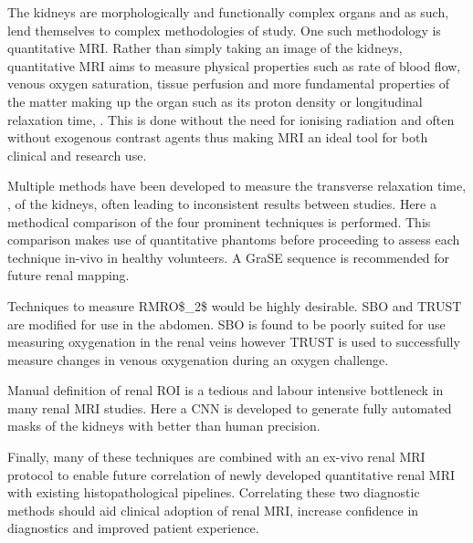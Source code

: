 The kidneys are morphologically and functionally complex organs and as such, lend themselves to complex methodologies of study. One such methodology is quantitative \ac{MRI}. Rather than simply taking an image of the kidneys, quantitative \ac{MRI} aims to measure physical properties such as rate of blood flow, venous oxygen saturation, tissue perfusion and more fundamental properties of the matter making up the organ such as its proton density or longitudinal relaxation time, \tone. This is done without the need for ionising radiation and often without exogenous contrast agents thus making \ac{MRI} an ideal tool for both clinical and research use.

Multiple methods have been developed to measure the transverse relaxation time, \ttwo, of the kidneys, often leading to inconsistent results between studies. Here a methodical comparison of the four prominent techniques is performed. This comparison makes use of quantitative phantoms before proceeding to assess each technique in-vivo in healthy volunteers. A \ac{GraSE} sequence is recommended for future renal \ttwo mapping.

Techniques to measure \ac{RMRO$_2$} would be highly desirable. \ac{SBO} and \ac{TRUST} are modified for use in the abdomen. \ac{SBO} is found to be poorly suited for use measuring oxygenation in the renal veins however \ac{TRUST} is used to successfully measure changes in venous oxygenation during an oxygen challenge.

Manual definition of renal \ac{ROI} is a tedious and labour intensive bottleneck in many renal \ac{MRI} studies. Here a \ac{CNN} is developed to generate fully automated masks of the kidneys with better than human precision.

Finally, many of these techniques are combined with an ex-vivo renal \ac{MRI} protocol to enable future correlation of newly developed quantitative renal \ac{MRI} with existing histopathological pipelines. Correlating these two diagnostic methods should aid clinical adoption of renal \ac{MRI}, increase confidence in diagnostics and improved patient experience.
